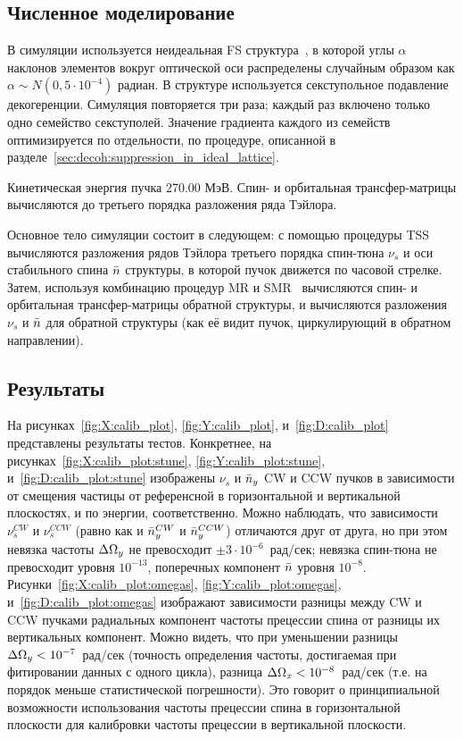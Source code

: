 \subsection{Численное моделирование}
В симуляции используется неидеальная FS структура~\cite{Senichev:Lattices}, в которой углы $\alpha$ 
наклонов элементов вокруг оптической оси распределены случайным образом 
как ${\alpha \sim N(0, 5\cdot10^{-4})}$ радиан. В структуре используется секступольное
подавление декогеренции. Симуляция повторяется три раза; каждый раз
включено только одно семейство секступолей. Значение градиента каждого
из семейств оптимизируется по отдельности, по процедуре, описанной
в разделе~\ref{sec:decoh:suppression_in_ideal_lattice}.

Кинетическая энергия пучка 270.00 МэВ.
Спин- и орбитальная трансфер-матрицы вычисляются до третьего порядка разложения ряда Тэйлора.

Основное тело симуляции состоит в следующем:
с помощью процедуры TSS~\cite[стр.~41]{COSYINF:Manual:BeamPhys} вычисляются разложения
рядов Тэйлора третьего порядка спин-тюна $\nu_s$ и оси стабильного спина $\bar n$ структуры, в которой пучок
движется по часовой стрелке. Затем, используя комбинацию процедур
MR и SMR~\cite[стр.~233]{Eremey:Thesis} вычисляются спин- и орбитальная трансфер-матрицы обратной структуры, и
вычисляются разложения $\nu_s$ и $\bar n$ для обратной структуры (как её видит пучок,
циркулирующий в обратном направлении).

\subsection{Результаты}

На рисунках~\ref{fig:X:calib_plot}, \ref{fig:Y:calib_plot}, и~\ref{fig:D:calib_plot} представлены
результаты тестов. Конкретнее, на рисунках~\ref{fig:X:calib_plot:stune},
\ref{fig:Y:calib_plot:stune}, и~\ref{fig:D:calib_plot:stune} изображены $\nu_s$ и $\bar n_y$
CW и CCW пучков в зависимости от смещения частицы от референсной в горизонтальной и вертикальной плоскостях,
и по энергии, соответственно. Можно наблюдать, что зависимости $\nu_s^{CW}$ и $\nu_s^{CCW}$ (равно как и
$\bar n_y^{CW}$ и $\bar n_y^{CCW}$) отличаются друг от друга, но при этом 
невязка частоты $\Delta\Omega_y$ не превосходит ${\pm3\cdot10^{-6}}$~рад/сек; 
невязка спин-тюна не превосходит уровня $10^{-13}$, поперечных компонент $\bar n$
уровня $10^{-8}$. Рисунки~\ref{fig:X:calib_plot:omegas}, \ref{fig:Y:calib_plot:omegas},
и~\ref{fig:D:calib_plot:omegas} изображают зависимости разницы между CW и CCW пучками
радиальных компонент частоты прецессии спина от разницы их вертикальных компонент. Можно видеть,
что при уменьшении разницы ${\Delta\Omega_y < 10^{-7}}$~рад/сек (точность определения частоты, достигаемая при
фитировании данных с одного цикла), разница ${\Delta \Omega_x < 10^{-8}}$~рад/сек (т.е.
на порядок меньше статистической погрешности). Это говорит о принципиальной возможности использования
частоты прецессии спина в горизонтальной плоскости для калибровки частоты прецессии в вертикальной плоскости.

